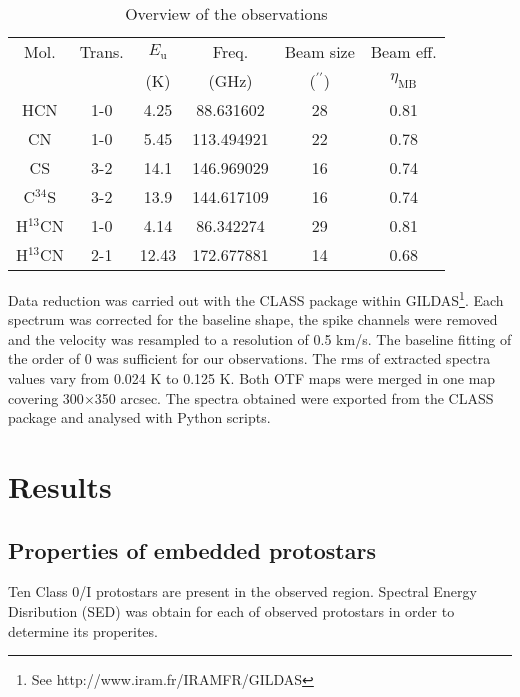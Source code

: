\documentclass{aa}
\begin{document}
\begin{table}
\caption{Overview of the observations}             %
\label{table:1}      %
\centering                          %
\begin{tabular}{c c c c c c}        %
\hline\hline                 %
Mol. & Trans. & $E_\mathrm{u}$ & Freq. &  Beam size & Beam eff.\\
 & & (K) & (GHz) & ($^{\prime\prime}$) & $\eta_\mathrm{MB}$\\
\hline                        %
HCN & 1-0 & 4.25 & 88.631602 & 28 & 0.81\\
CN & 1-0 & 5.45 & 113.494921 & 22 & 0.78\\
CS & 3-2 & 14.1 & 146.969029 & 16 & 0.74\\
C$^{34}$S & 3-2 & 13.9 & 144.617109 & 16 & 0.74\\
H$^{13}$CN & 1-0 & 4.14 & 86.342274 & 29 & 0.81\\
H$^{13}$CN & 2-1 & 12.43 & 172.677881 & 14 & 0.68\\
\hline                                   
\end{tabular}
\end{table}

Data reduction was carried out with the CLASS package within GILDAS\footnote{See http://www.iram.fr/IRAMFR/GILDAS}. Each spectrum was corrected for the baseline shape, the spike channels were removed and the velocity was resampled to a resolution of 0.5 km/s. The baseline fitting of the order of 0 was sufficient for our observations. The rms of extracted spectra values vary from 0.024 K to 0.125 K. Both OTF maps were merged in one map covering 300$\times$350 arcsec. The spectra obtained were exported from the CLASS package and analysed with Python scripts. 


\section{Results}

\subsection{Properties of embedded protostars}
Ten Class 0/I protostars are present in the observed region. Spectral Energy Disribution (SED) was obtain for each of observed protostars in order to determine its properites. 
\end{document}
